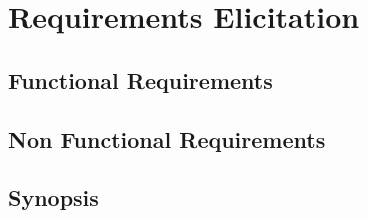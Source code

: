 
\chapter{Requirements Elicitation} %

\label{chap:Chapter4} %


\section{Functional Requirements}

\section{Non Functional Requirements}

\section{Synopsis}